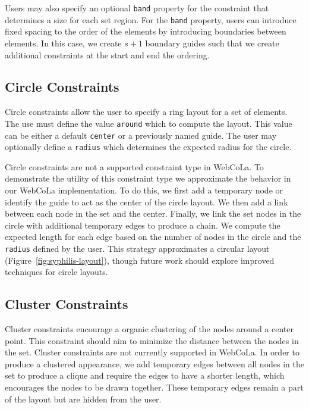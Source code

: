 Users may also specify an optional
\texttt{band} property for the constraint that determines a size for each
set region. For the \texttt{band} property, users can introduce fixed spacing
to the order of the elements by introducing boundaries between elements. In
this case, we create $s+1$ boundary guides such that we create additional 
constraints at the start and end the ordering.


\subsection{Circle Constraints}
Circle constraints allow the user to specify a ring layout for a set of
elements. The use must define the value \texttt{around} which to compute 
the layout. This value can be either a default \texttt{center} or a previously 
named guide. The user may optionally define a \texttt{radius} which 
determines the expected radius for the circle.


Circle constraints are not a supported constraint type in WebCoLa. To
demonstrate the utility of this constraint type we approximate the behavior
in our WebCoLa implementation. To do this, we first add a temporary node
or identify the guide to act as the center of the circle layout.  We
then add a link between each
node in the set and the center. Finally, we link the set nodes in the circle
with additional temporary edges to produce a chain. We compute the expected
length for each edge based on the number of nodes in the circle and the 
\texttt{radius} defined by the user. This strategy approximates a circular
layout (Figure~\ref{fig:syphilis-layout}), though future work should
explore improved techniques for circle layouts.


\subsection{Cluster Constraints}
Cluster constraints encourage a organic clustering of the nodes around
a center point. This constraint should aim to minimize the distance between
the nodes in the set.
Cluster constraints are not currently supported in WebCoLa. In order to
produce a clustered appearance, we add temporary edges between all nodes
in the set to produce a clique and require the edges to have a shorter length,
which encourages the nodes to be drawn together. These temporary edges
remain a part of the layout but are hidden from the user.

